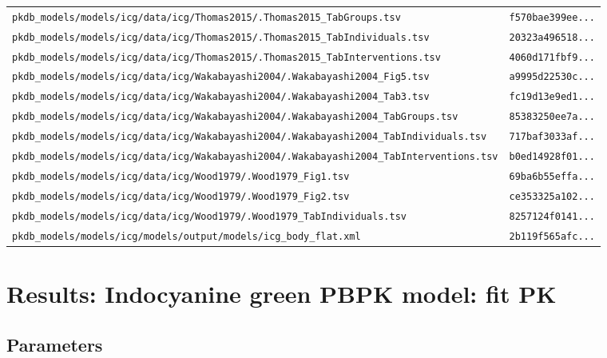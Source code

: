 \begin{longtable}{ll}
\texttt{pkdb\_models/models/icg/data/icg/Thomas2015/.Thomas2015\_TabGroups.tsv} & \texttt{f570bae399ee...} \\
\texttt{pkdb\_models/models/icg/data/icg/Thomas2015/.Thomas2015\_TabIndividuals.tsv} & \texttt{20323a496518...} \\
\texttt{pkdb\_models/models/icg/data/icg/Thomas2015/.Thomas2015\_TabInterventions.tsv} & \texttt{4060d171fbf9...} \\
\texttt{pkdb\_models/models/icg/data/icg/Wakabayashi2004/.Wakabayashi2004\_Fig5.tsv} & \texttt{a9995d22530c...} \\
\texttt{pkdb\_models/models/icg/data/icg/Wakabayashi2004/.Wakabayashi2004\_Tab3.tsv} & \texttt{fc19d13e9ed1...} \\
\texttt{pkdb\_models/models/icg/data/icg/Wakabayashi2004/.Wakabayashi2004\_TabGroups.tsv} & \texttt{85383250ee7a...} \\
\texttt{pkdb\_models/models/icg/data/icg/Wakabayashi2004/.Wakabayashi2004\_TabIndividuals.tsv} & \texttt{717baf3033af...} \\
\texttt{pkdb\_models/models/icg/data/icg/Wakabayashi2004/.Wakabayashi2004\_TabInterventions.tsv} & \texttt{b0ed14928f01...} \\
\texttt{pkdb\_models/models/icg/data/icg/Wood1979/.Wood1979\_Fig1.tsv} & \texttt{69ba6b55effa...} \\
\texttt{pkdb\_models/models/icg/data/icg/Wood1979/.Wood1979\_Fig2.tsv} & \texttt{ce353325a102...} \\
\texttt{pkdb\_models/models/icg/data/icg/Wood1979/.Wood1979\_TabIndividuals.tsv} & \texttt{8257124f0141...} \\
\texttt{pkdb\_models/models/icg/models/output/models/icg\_body\_flat.xml} & \texttt{2b119f565afc...} \\
\end{longtable}

\section{Results: Indocyanine green PBPK model: fit PK}

\subsection{Parameters}

